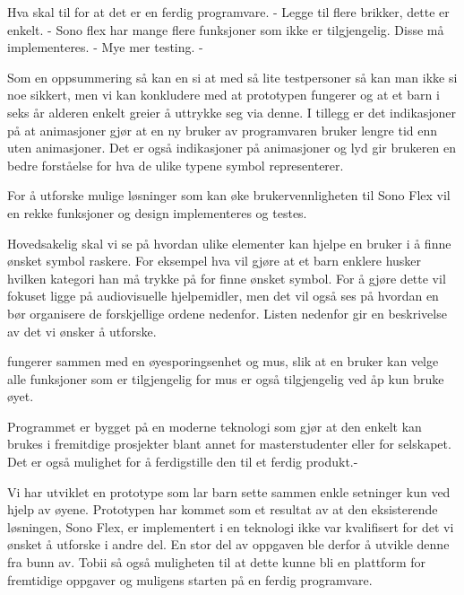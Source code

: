 Hva skal til for at det er en ferdig programvare.
    - Legge til flere brikker, dette er enkelt.
    - Sono flex har mange flere funksjoner som ikke er tilgjengelig. Disse må implementeres. 
    - Mye mer testing.
    - 


Som en oppsummering så kan en si at med så lite testpersoner så kan man ikke si noe sikkert, men vi kan konkludere med at prototypen fungerer og at et barn i seks år alderen enkelt greier å uttrykke seg via denne. I tillegg er det indikasjoner på at animasjoner gjør at en ny bruker av programvaren bruker lengre tid enn uten animasjoner. Det er også indikasjoner på animasjoner og lyd gir brukeren en bedre forståelse for hva de ulike typene symbol representerer.  

For å utforske mulige løsninger som kan øke brukervennligheten til Sono Flex  vil en rekke funksjoner og design implementeres og testes. 

Hovedsakelig skal vi se på hvordan ulike elementer kan hjelpe en bruker i å finne ønsket symbol raskere. For eksempel hva vil gjøre at et barn enklere husker hvilken kategori han må trykke på for finne ønsket symbol. For å gjøre dette vil fokuset ligge på audiovisuelle hjelpemidler, men det vil også ses på hvordan en bør organisere de forskjellige ordene nedenfor. Listen nedenfor gir en  beskrivelse av det vi ønsker å utforske.



fungerer sammen med en øyesporingsenhet og mus, slik at en bruker kan velge alle funksjoner som er tilgjengelig for mus er også tilgjengelig ved åp kun bruke øyet.

Programmet er bygget på en moderne teknologi som gjør at den enkelt kan brukes i fremitdige prosjekter blant annet for masterstudenter eller for selskapet. Det er også mulighet for å ferdigstille den til et ferdig produkt.-



Vi har utviklet en prototype som lar barn sette sammen enkle setninger kun ved hjelp av øyene. Prototypen har kommet som et resultat av at den eksisterende løsningen, Sono Flex, er implementert i en teknologi ikke var kvalifisert for det vi ønsket å utforske i andre del. En stor del av oppgaven ble derfor å utvikle denne fra bunn av. Tobii så også muligheten til at dette kunne bli en plattform for fremtidige oppgaver og muligens starten på en ferdig programvare. 
























